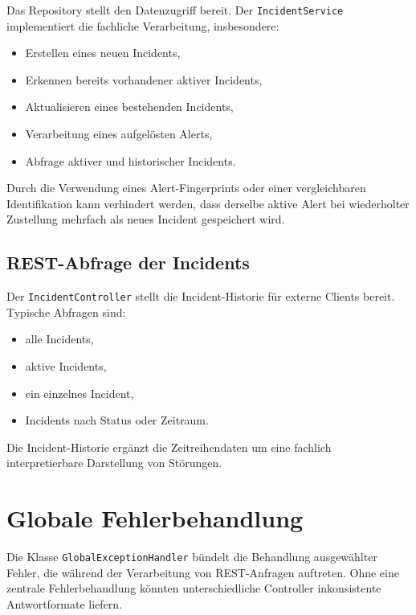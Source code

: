 Das Repository stellt den Datenzugriff bereit. Der \texttt{IncidentService} implementiert die fachliche Verarbeitung, insbesondere:

\begin{itemize}
    \item Erstellen eines neuen Incidents,
    \item Erkennen bereits vorhandener aktiver Incidents,
    \item Aktualisieren eines bestehenden Incidents,
    \item Verarbeitung eines aufgelösten Alerts,
    \item Abfrage aktiver und historischer Incidents.
\end{itemize}

Durch die Verwendung eines Alert-Fingerprints oder einer vergleichbaren Identifikation kann verhindert werden, dass derselbe aktive Alert bei wiederholter Zustellung mehrfach als neues Incident gespeichert wird.

\subsection{REST-Abfrage der Incidents}
\label{subsec:incident-api-implementierung}

Der \texttt{IncidentController} stellt die Incident-Historie für externe Clients bereit. Typische Abfragen sind:

\begin{itemize}
    \item alle Incidents,
    \item aktive Incidents,
    \item ein einzelnes Incident,
    \item Incidents nach Status oder Zeitraum.
\end{itemize}

Die Incident-Historie ergänzt die Zeitreihendaten um eine fachlich interpretierbare Darstellung von Störungen.

\section{Globale Fehlerbehandlung}
\label{sec:globale-fehlerbehandlung}

Die Klasse \texttt{GlobalExceptionHandler} bündelt die Behandlung ausgewählter Fehler, die während der Verarbeitung von REST-Anfragen auftreten. Ohne eine zentrale Fehlerbehandlung könnten unterschiedliche Controller inkonsistente Antwortformate liefern.

